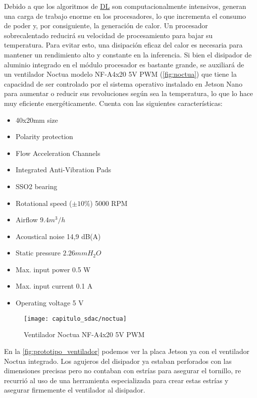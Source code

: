 Debido a que los algoritmos de \hyperlink{abbr}{DL} son computacionalmente
intensivos, generan una carga de trabajo enorme en los procesadores, lo que
incrementa el consumo de poder y, por consiguiente, la generación de calor. Un
procesador sobrecalentado reducirá su velocidad de procesamiento para bajar su
temperatura. Para evitar esto, una disipación eficaz del calor es necesaria para
mantener un rendimiento alto y constante en la inferencia. Si bien el disipador
de aluminio integrado en el módulo procesador es bastante grande, se auxiliará
de un ventilador Noctua modelo NF-A4x20 5V PWM (\autoref{fig:noctua}) que tiene
la capacidad de ser controlado por el sistema operativo instalado en Jetson Nano
para aumentar o reducir sus revoluciones según sea la temperatura, lo que lo
hace muy eficiente energéticamente. Cuenta con las siguientes características:

\begin{minipage}{\textwidth}
\begin{itemize}
    \item 40x20mm size
    \item Polarity protection
    \item Flow Acceleration Channels
    \item Integrated Anti-Vibration Pads
    \item SSO2 bearing
    \item Rotational speed (\(\pm 10\%\)) 5000 RPM
    \item Airflow \(9.4 m^{3}/h\)
    \item Acoustical noise 14,9 dB(A)
    \item Static pressure \(2.26 mm H_{2}O\)
    \item Max. input power 0.5 W
    \item Max. input current 0.1 A    
    \item Operating voltage 5 V
\end{itemize}
\end{minipage}

\begin{figure}[H]
    \centering
    \texttt{[image: capitulo\_sdac/noctua]}
    \caption{Ventilador Noctua NF-A4x20 5V PWM}\label{fig:noctua}
\end{figure}

En la \autoref{fig:prototipo_ventilador} podemos ver la placa Jetson ya con el
ventilador Noctua integrado. Los agujeros del disipador ya estaban perforados
con las dimensiones precisas pero no contaban con estrías para asegurar el
tornillo, re recurrió al uso de una herramienta especializada para crear estas
estrías y asegurar firmemente el ventilador al disipador.

